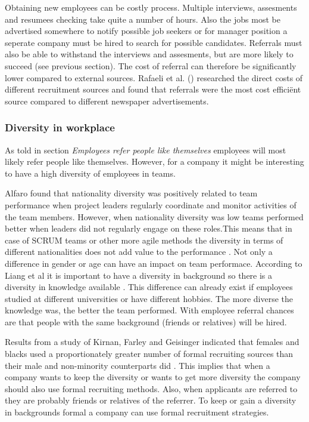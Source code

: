\documentclass[Main.tex]{subfiles}
\begin{document}
Obtaining new employees can be costly process. Multiple interviews, assesments and resumees checking take quite a number of hours. Also the jobs most be advertised somewhere to notify possible job seekers or for manager position a seperate company must be hired to search for possible candidates. Referrals  must also be able to withstand the interviews and assesments, but are more likely to succeed (see previous section). The cost of referral can therefore be significantly lower compared to external sources. Rafaeli et al. (\cite{fourth}) researched the direct costs of different recruitment sources and found that referrals were the most cost efficiënt source compared to different newspaper advertisements.


\subsubsection*{Diversity in workplace}
As told in section \emph{Employees refer people like themselves} employees will most likely refer people like themselves. However, for a company it might be interesting to have a high diversity of employees in teams. 

Alfaro found that nationality diversity was positively related to team performance when project leaders regularly coordinate and monitor activities of the team members. However, when nationality diversity was low teams performed better when leaders did 
not regularly engage on these roles.This means that in case of SCRUM teams or other more agile methods the diversity in terms of different nationalities does not add value to the performance \cite{diversity}.
Not only a difference in gender or age can have an impact on team performace. According to Liang et al it is important to have a diversity in background so there is a diversity in knowledge available \cite{teamdiversity}. This difference can already exist if employees studied at different universities or have different hobbies. The more diverse the knowledge was, the better the team performed. With employee referral chances are that people with the same background (friends or relatives) will be hired. 

Results from a study of Kirnan, Farley and Geisinger indicated that females and blacks used a proportionately greater number of formal recruiting sources than their male and non-minority counterparts did \cite{tenth}. This implies that when a company wants to keep the diversity or wants to get more diversity the company should also use formal recruiting methods. Also, when applicants are referred to they are probably friends or relatives of the referrer. To keep or gain a diversity in backgrounds formal a company can use formal recruitment strategies.
\end{document}
